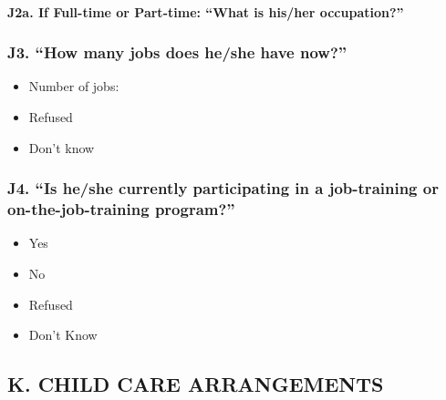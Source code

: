 \documentclass[
  12pt,
]{book}
\providecommand{\tightlist}{%
  \setlength{\itemsep}{0pt}\setlength{\parskip}{0pt}}
\begin{document}
\hypertarget{j2a.-if-full-time-or-part-time-what-is-hisher-occupation}{%
\paragraph*{J2a. If Full-time or Part-time: ``What is his/her occupation?''}\label{j2a.-if-full-time-or-part-time-what-is-hisher-occupation}}

\hypertarget{j3.-how-many-jobs-does-heshe-have-now}{%
\subsubsection*{J3. ``How many jobs does he/she have now?''}\label{j3.-how-many-jobs-does-heshe-have-now}}

\begin{itemize}
\tightlist
\item
  Number of jobs:
\item
  Refused
\item
  Don't know
\end{itemize}

\hypertarget{j4.-is-heshe-currently-participating-in-a-job-training-or-on-the-job-training-program}{%
\subsubsection*{J4. ``Is he/she currently participating in a job-training or on-the-job-training program?''}\label{j4.-is-heshe-currently-participating-in-a-job-training-or-on-the-job-training-program}}

\begin{itemize}
\tightlist
\item
  Yes
\item
  No
\item
  Refused
\item
  Don't Know
\end{itemize}

\hypertarget{k.-child-care-arrangements}{%
\subsection*{K. CHILD CARE ARRANGEMENTS}\label{k.-child-care-arrangements}}
\end{document}
